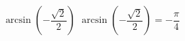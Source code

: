  {$\arcsin \left( -\dfrac{\sqrt{2}}{2} \right)$}
{ $\arcsin \left( -\dfrac{\sqrt{2}}{2} \right) = -\dfrac{\pi}{4}$}
